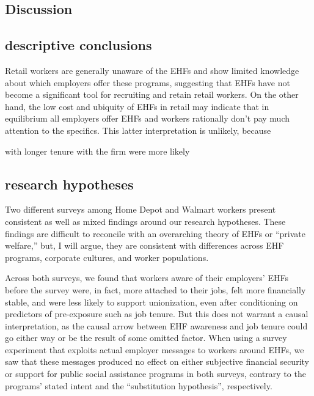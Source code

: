 \documentclass[
  11pt,
  oneside]{article}
\begin{document}
\subsection{Discussion}\label{discussion}

\subsection{descriptive conclusions}\label{descriptive-conclusions}

Retail workers are generally unaware of the EHFs and show limited knowledge about which employers offer these programs, suggesting that EHFs have not become a significant tool for recruiting and retain retail workers. On the other hand, the low cost and ubiquity of EHFs in retail may indicate that in equilibrium all employers offer EHFs and workers rationally don't pay much attention to the specifics. This latter interpretation is unlikely, because

with longer tenure with the firm were more likely

\subsection{research hypotheses}\label{research-hypotheses}

Two different surveys among Home Depot and Walmart workers present consistent as well as mixed findings around our research hypotheses. These findings are difficult to reconcile with an overarching theory of EHFs or ``private welfare,'' but, I will argue, they are consistent with differences across EHF programs, corporate cultures, and worker populations.

Across both surveys, we found that workers aware of their employers' EHFs before the survey were, in fact, more attached to their jobs, felt more financially stable, and were less likely to support unionization, even after conditioning on predictors of pre-exposure such as job tenure. But this does not warrant a causal interpretation, as the causal arrow between EHF awareness and job tenure could go either way or be the result of some omitted factor. When using a survey experiment that exploits actual employer messages to workers around EHFs, we saw that these messages produced no effect on either subjective financial security or support for public social assistance programs in both surveys, contrary to the programs' stated intent and the ``substitution hypothesis'', respectively.
\end{document}
